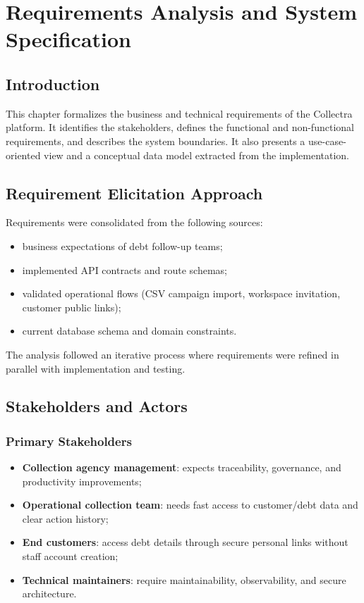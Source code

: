 \chapter{Requirements Analysis and System Specification}
\label{chap:requirements-analysis}

\section*{Introduction}
This chapter formalizes the business and technical requirements of the Collectra platform. It identifies the stakeholders, defines the functional and non-functional requirements, and describes the system boundaries. It also presents a use-case-oriented view and a conceptual data model extracted from the implementation.

\section{Requirement Elicitation Approach}
Requirements were consolidated from the following sources:
\begin{itemize}
  \item business expectations of debt follow-up teams;
  \item implemented API contracts and route schemas;
  \item validated operational flows (CSV campaign import, workspace invitation, customer public links);
  \item current database schema and domain constraints.
\end{itemize}

The analysis followed an iterative process where requirements were refined in parallel with implementation and testing.

\section{Stakeholders and Actors}
\subsection{Primary Stakeholders}
\begin{itemize}
  \item \textbf{Collection agency management}: expects traceability, governance, and productivity improvements;
  \item \textbf{Operational collection team}: needs fast access to customer/debt data and clear action history;
  \item \textbf{End customers}: access debt details through secure personal links without staff account creation;
  \item \textbf{Technical maintainers}: require maintainability, observability, and secure architecture.
\end{itemize}

